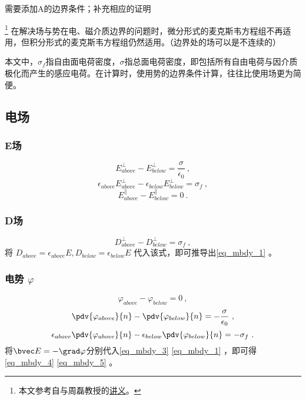 
\begin{issues}
\issueTODO 需要添加A的边界条件；补充相应的证明
\end{issues}

\footnote{本文参考自\cite{GriffE}与周磊教授的\href{http://fdjpkc.fudan.edu.cn/d200927/2009/0314/c8569a14801/page.htm}{讲义}。}
在解决场与势在电、磁介质边界的问题时，微分形式的麦克斯韦方程组不再适用，但积分形式的麦克斯韦方程组仍然适用。（边界处的场可以是不连续的）

本文中，$\sigma_f$指自由面电荷密度，$\sigma$指总面电荷密度，即包括所有自由电荷与因介质极化而产生的感应电荷。在计算时，使用势的边界条件计算，往往比使用场更为简便。

\subsection{电场}

\subsubsection{E场}
\begin{equation}\label{eq_mbdy_3}
E^\perp_{above} - E^\perp_{below} = \frac{\sigma}{\epsilon_0}~,
\end{equation}
\begin{equation}\label{eq_mbdy_1}
\epsilon_{above}E^\perp_{above} - \epsilon_{below}E^\perp_{below} = \sigma_f~,
\end{equation}
\begin{equation}\label{eq_mbdy_7}
E^\parallel_{above} - E^\parallel_{below} = 0~.
\end{equation}

\subsubsection{D场}
\begin{equation}\label{eq_mbdy_6}
D^\perp_{above} - D^\perp_{below} = \sigma_f~,
\end{equation}
将 $D_{above}=\epsilon_{above} E, D_{below}=\epsilon_{below} E$ 代入该式，即可推导出\autoref{eq_mbdy_1} 。

\subsubsection{电势 $\varphi$}
\begin{equation}
\varphi_{above}-\varphi_{below}=0~,
\end{equation}
\begin{equation}\label{eq_mbdy_4}
\pdv{\varphi_{above}}{n} - \pdv{\varphi_{below}}{n}  = -\frac{\sigma}{\epsilon_0}~,
\end{equation}
\begin{equation}\label{eq_mbdy_5}
\epsilon_{above}\pdv{\varphi_{above}}{n} - \epsilon_{below}\pdv{\varphi_{below}}{n}  = -\sigma_f~.
\end{equation}
将$\bvec E= -\grad \varphi$分别代入\autoref{eq_mbdy_3} \autoref{eq_mbdy_1} ，即可得\autoref{eq_mbdy_4} \autoref{eq_mbdy_5} 。



